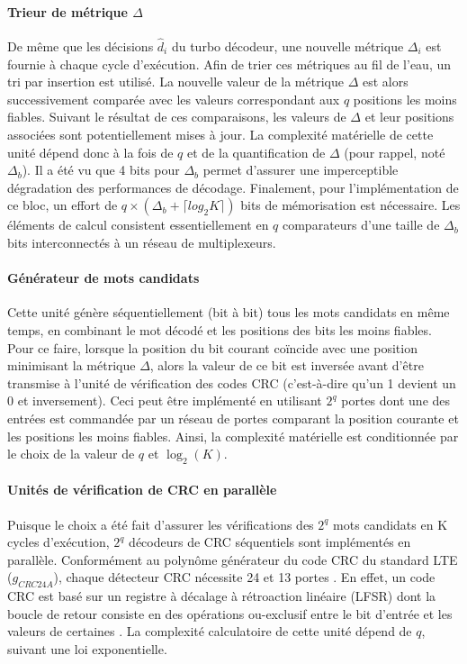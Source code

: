\paragraph*{Trieur de métrique $\Delta$} De même que les décisions $\hat{d}_i$ du turbo décodeur, une nouvelle métrique $\Delta_i$ 
est fournie à chaque cycle d'exécution. Afin de trier ces métriques au
fil de l'eau, un tri par insertion est utilisé. La nouvelle valeur de la métrique $\Delta$ est alors successivement 
comparée avec les valeurs correspondant aux $q$ positions les moins fiables. Suivant le résultat de ces comparaisons, 
les valeurs de $\Delta$ et leur positions associées sont potentiellement mises à jour. La complexité matérielle de cette unité dépend donc 
à la fois de $q$ et de la quantification de $\Delta$ (pour rappel, noté $\Delta_b$). Il a été vu que 4 bits 
pour $\Delta_b$ permet d'assurer une imperceptible dégradation des performances de décodage. Finalement, pour 
l'implémentation de ce bloc, un effort de 
$q\times(\Delta_b + \lceil log_2{K} \rceil)$ bits de mémorisation est nécessaire. Les éléments de calcul consistent 
essentiellement en $q$ comparateurs d'une taille de $\Delta_b$ bits interconnectés à un réseau de multiplexeurs.

\paragraph*{Générateur de mots candidats} Cette unité génère séquentiellement (bit à bit) tous les mots candidats en 
même temps, en combinant le mot décodé et les positions des bits les moins fiables. Pour ce faire, lorsque la position 
du bit courant coïncide avec une position minimisant la métrique $\Delta$, alors la valeur de ce bit est inversée avant d'être
transmise à l'unité de vérification des codes CRC (c'est-à-dire qu'un 1 devient un 0 et inversement). Ceci peut être 
implémenté en utilisant $2^q$ portes  dont 
une des entrées est commandée par un réseau de portes  comparant la position courante et les positions les moins 
fiables. Ainsi, la complexité matérielle est conditionnée par le choix de la valeur de $q$ et $\log_2(K)$.

\paragraph*{Unités de vérification de CRC en parallèle} Puisque le choix a été fait d'assurer les vérifications 
des $2^q$ mots candidats en K cycles d'exécution, $2^q$ décodeurs de CRC séquentiels sont implémentés en parallèle.
Conformément au polynôme générateur du code CRC du standard LTE ($g_{CRC24A}$), chaque détecteur CRC nécessite 24 
 et 13 portes . En effet, un code CRC est basé sur un registre à décalage à rétroaction 
linéaire (LFSR) dont la boucle de retour consiste en des opérations ou-exclusif entre le bit d'entrée et les valeurs de
certaines  
. La complexité calculatoire de cette unité dépend de $q$, suivant une loi 
exponentielle.

